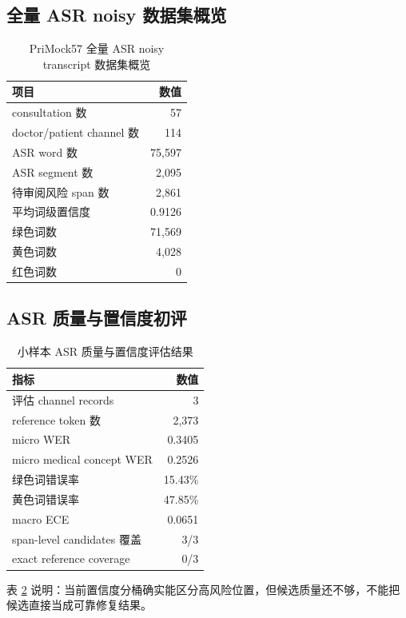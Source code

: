 \documentclass[UTF8,a4paper,12pt]{ctexart}
\begin{document}
\subsection{全量 ASR noisy 数据集概览}

\begin{table}[H]
\centering
\caption{PriMock57 全量 ASR noisy transcript 数据集概览}
\label{tab:full-asr-dataset}
\begin{tabular}{lr}
\toprule
项目 & 数值 \\
\midrule
consultation 数 & 57 \\
doctor/patient channel 数 & 114 \\
ASR word 数 & 75,597 \\
ASR segment 数 & 2,095 \\
待审阅风险 span 数 & 2,861 \\
平均词级置信度 & 0.9126 \\
绿色词数 & 71,569 \\
黄色词数 & 4,028 \\
红色词数 & 0 \\
\bottomrule
\end{tabular}
\end{table}

\subsection{ASR 质量与置信度初评}

\begin{table}[H]
\centering
\caption{小样本 ASR 质量与置信度评估结果}
\label{tab:asr-quality}
\begin{tabular}{lr}
\toprule
指标 & 数值 \\
\midrule
评估 channel records & 3 \\
reference token 数 & 2,373 \\
micro WER & 0.3405 \\
micro medical concept WER & 0.2526 \\
绿色词错误率 & 15.43\% \\
黄色词错误率 & 47.85\% \\
macro ECE & 0.0651 \\
span-level candidates 覆盖 & 3/3 \\
exact reference coverage & 0/3 \\
\bottomrule
\end{tabular}
\end{table}

表 \ref{tab:asr-quality} 说明：当前置信度分桶确实能区分高风险位置，但候选质量还不够，不能把候选直接当成可靠修复结果。
\end{document}

